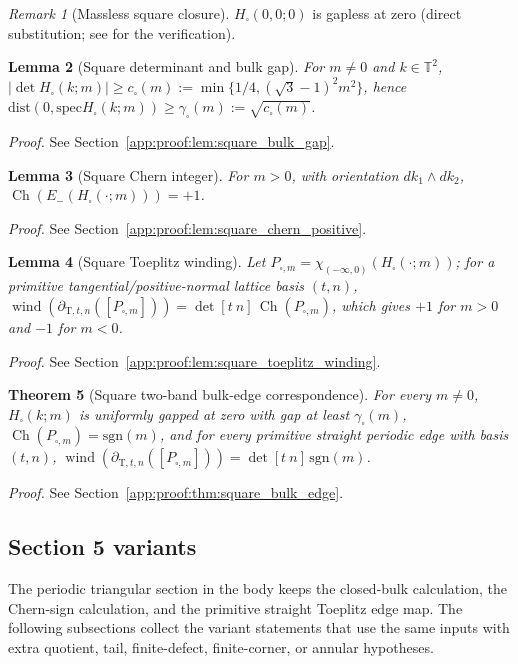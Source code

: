 \documentclass[11pt]{article}
\numberwithin{equation}{section}
\newtheorem{theorem}{Theorem}[section]
\newtheorem{lemma}[theorem]{Lemma}
\theoremstyle{definition}
\theoremstyle{remark}
\newtheorem{remark}[theorem]{Remark}
\newcommand{\proofref}[1]{%
  \par\noindent\emph{Proof.} See Section~\ref{#1}.\par\medskip
}
\newcommand{\proofappendixref}[1]{\proofref{#1}}
\newcommand{\spec}{\mathrm{spec}}
\newcommand{\dist}{\mathrm{dist}}
\newcommand{\sgn}{\mathrm{sgn}}
\newcommand{\Ch}{\operatorname{Ch}}
\begin{document}
\begin{remark}[Massless square closure]\label{lem:square_massless_closure}
\(H_{\square}(0,0;0)\) is gapless at zero (direct substitution; see
 for the verification).
\end{remark}

\begin{lemma}[Square determinant and bulk gap]\label{lem:square_bulk_gap}
For \(m\ne0\) and \(k\in\mathbb T^2\),
\(|\det H_{\square}(k;m)|\ge c_{\square}(m):=\min\{1/4,(\sqrt{3}-1)^2m^2\}\), hence
\(\dist(0,\spec H_{\square}(k;m))\ge\gamma_{\square}(m):=\sqrt{c_{\square}(m)}\).
\end{lemma}
\proofappendixref{app:proof:lem:square_bulk_gap}

\begin{lemma}[Square Chern integer]\label{lem:square_chern_positive}
For \(m>0\), with orientation \(dk_1\wedge dk_2\),
\(\Ch(E_-(H_{\square}(\cdot;m)))=+1\).
\end{lemma}
\proofappendixref{app:proof:lem:square_chern_positive}

\begin{lemma}[Square Toeplitz winding]\label{lem:square_toeplitz_winding}
Let \(P_{\square,m}=\chi_{(-\infty,0)}(H_{\square}(\cdot;m))\); for a primitive
tangential/positive-normal lattice basis \((t,n)\),
\(\operatorname{wind}(\partial_{\mathrm T,t,n}([P_{\square,m}]))=\det[t\ n]\,\Ch(P_{\square,m})\),
which gives \(+1\) for \(m>0\) and \(-1\) for \(m<0\).
\end{lemma}
\proofappendixref{app:proof:lem:square_toeplitz_winding}

\begin{theorem}[Square two-band bulk-edge correspondence]\label{thm:square_bulk_edge}
For every \(m\ne0\), \(H_{\square}(k;m)\) is uniformly gapped at zero with gap at least
\(\gamma_{\square}(m)\), \(\Ch(P_{\square,m})=\sgn(m)\), and for every primitive straight periodic
edge with basis \((t,n)\),
\(\operatorname{wind}(\partial_{\mathrm T,t,n}([P_{\square,m}]))=\det[t\ n]\,\sgn(m)\).
\end{theorem}
\proofappendixref{app:proof:thm:square_bulk_edge}




\subsection{Section 5 variants}\label{app:section5_variants}
The periodic triangular section in the body keeps the closed-bulk calculation, the Chern-sign
calculation, and the primitive straight Toeplitz edge map. The following subsections collect the
variant statements that use the same inputs with extra quotient, tail, finite-defect, finite-corner,
or annular hypotheses.
\end{document}
